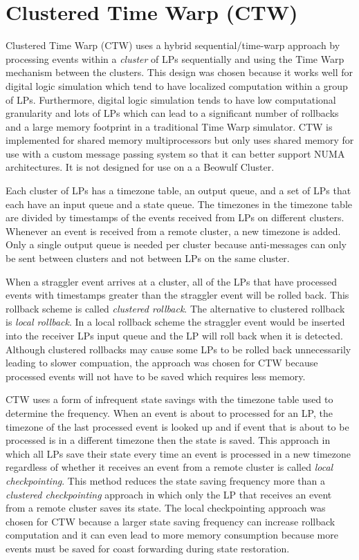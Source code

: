\documentclass[11pt]{book}
\begin{document}
\section{Clustered Time Warp (CTW)}

Clustered Time Warp \cite{avril-95} (CTW) uses a hybrid sequential/time-warp approach by
processing events within a \emph{cluster} of LPs sequentially and using the Time Warp
mechanism between the clusters.  This design was chosen because it works well for digital
logic simulation which tend to have localized computation within a group of LPs.
Furthermore, digital logic simulation tends to have low computational granularity and lots
of LPs which can lead to a significant number of rollbacks and a large memory footprint in
a traditional Time Warp simulator.  CTW is implemented for shared memory multiprocessors
but only uses shared memory for use with a custom message passing system so that it can
better support NUMA architectures.  It is not designed for use on a a Beowulf Cluster.

Each cluster of LPs has a timezone table, an output queue, and a set of LPs that each have
an input queue and a state queue.  The timezones in the timezone table are divided by
timestamps of the events received from LPs on different clusters.  Whenever an event is
received from a remote cluster, a new timezone is added.  Only a single output queue is
needed per cluster because anti-messages can only be sent between clusters and not between
LPs on the same cluster.

When a straggler event arrives at a cluster, all of the LPs that have processed events
with timestamps greater than the straggler event will be rolled back.  This rollback
scheme is called \emph{clustered rollback}.  The alternative to clustered rollback is
\emph{local rollback}.  In a local rollback scheme the straggler event would be inserted
into the receiver LPs input queue and the LP will roll back when it is detected.  Although
clustered rollbacks may cause some LPs to be rolled back unnecessarily leading to slower
compuation, the approach was chosen for CTW because processed events will not have to be
saved which requires less memory.

CTW uses a form of infrequent state savings with the timezone table used to determine the
frequency.  When an event is about to processed for an LP, the timezone of the last
processed event is looked up and if event that is about to be processed is in a different
timezone then the state is saved.  This approach in which all LPs save their state every
time an event is processed in a new timezone regardless of whether it receives an event
from a remote cluster is called \emph{local checkpointing}.  This method reduces the state
saving frequency more than a \emph{clustered checkpointing} approach in which only the LP
that receives an event from a remote cluster saves its state.  The local checkpointing
approach was chosen for CTW because a larger state saving frequency can increase rollback
computation and it can even lead to more memory consumption because more events must be
saved for coast forwarding during state restoration.
\end{document}
